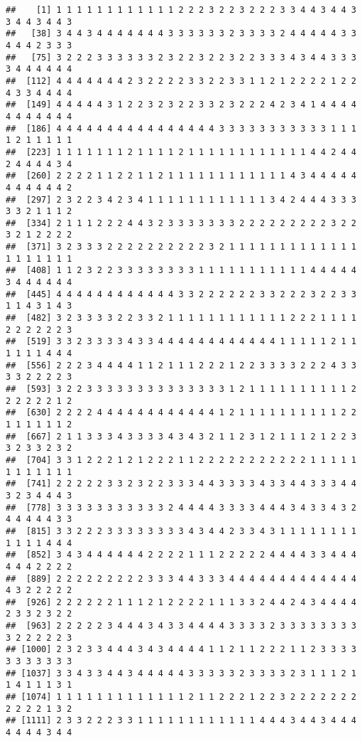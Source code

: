 \documentclass[
]{article}
\begin{document}
\begin{verbatim}
##    [1] 1 1 1 1 1 1 1 1 1 1 1 1 2 2 2 3 2 2 3 2 2 2 3 3 4 4 3 4 4 3 3 4 4 3 4 4 3
##   [38] 3 4 4 3 4 4 4 4 4 4 4 3 3 3 3 3 3 2 3 3 3 3 2 4 4 4 4 4 3 3 4 4 4 2 3 3 3
##   [75] 3 2 2 2 3 3 3 3 3 3 2 3 2 2 3 2 2 3 2 2 3 3 3 4 3 4 4 3 3 3 3 4 4 4 4 4 4
##  [112] 4 4 4 4 4 4 4 2 3 2 2 2 2 3 3 2 2 3 3 1 1 2 1 2 2 2 2 1 2 2 4 3 3 4 4 4 4
##  [149] 4 4 4 4 4 3 1 2 2 3 2 3 2 2 3 3 2 3 2 2 2 4 2 3 4 1 4 4 4 4 4 4 4 4 4 4 4
##  [186] 4 4 4 4 4 4 4 4 4 4 4 4 4 4 4 4 3 3 3 3 3 3 3 3 3 3 3 1 1 1 1 2 1 1 1 1 1
##  [223] 1 1 1 1 1 1 1 2 1 1 1 1 2 1 1 1 1 1 1 1 1 1 1 1 1 4 4 2 4 4 2 4 4 4 4 3 4
##  [260] 2 2 2 2 1 1 2 2 1 1 2 1 1 1 1 1 1 1 1 1 1 1 1 4 3 4 4 4 4 4 4 4 4 4 4 4 2
##  [297] 2 3 2 2 3 4 2 3 4 1 1 1 1 1 1 1 1 1 1 1 1 3 4 2 4 4 4 3 3 3 3 3 2 1 1 1 2
##  [334] 2 1 1 1 2 2 2 4 4 3 2 3 3 3 3 3 3 3 2 2 2 2 2 2 2 2 2 3 2 2 3 2 1 2 2 2 2
##  [371] 3 2 3 3 3 2 2 2 2 2 2 2 2 2 2 3 2 1 1 1 1 1 1 1 1 1 1 1 1 1 1 1 1 1 1 1 1
##  [408] 1 1 2 3 2 2 3 3 3 3 3 3 3 3 1 1 1 1 1 1 1 1 1 1 1 4 4 4 4 4 3 4 4 4 4 4 4
##  [445] 4 4 4 4 4 4 4 4 4 4 4 4 3 3 2 2 2 2 2 2 3 3 2 2 2 3 2 2 3 3 1 1 4 3 1 4 3
##  [482] 3 2 3 3 3 3 2 2 3 3 2 1 1 1 1 1 1 1 1 1 1 1 1 2 2 2 1 1 1 1 2 2 2 2 2 2 3
##  [519] 3 3 2 3 3 3 3 4 3 3 4 4 4 4 4 4 4 4 4 4 4 4 1 1 1 1 1 2 1 1 1 1 1 1 4 4 4
##  [556] 2 2 2 3 4 4 4 4 1 1 2 1 1 1 2 2 2 1 2 2 3 3 3 3 2 2 2 4 3 3 3 3 2 2 2 2 3
##  [593] 3 2 2 3 3 3 3 3 3 3 3 3 3 3 3 3 3 1 2 1 1 1 1 1 1 1 1 1 1 2 2 2 2 2 2 1 2
##  [630] 2 2 2 2 4 4 4 4 4 4 4 4 4 4 4 4 1 2 1 1 1 1 1 1 1 1 1 1 2 2 1 1 1 1 1 1 2
##  [667] 2 1 1 3 3 3 4 3 3 3 3 4 3 4 3 2 1 1 2 3 1 2 1 1 1 2 1 2 2 3 3 2 3 3 2 3 2
##  [704] 3 3 1 2 2 2 1 2 1 2 2 2 1 1 2 2 2 2 2 2 2 2 2 2 2 1 1 1 1 1 1 1 1 1 1 1 1
##  [741] 2 2 2 2 2 3 3 2 3 2 2 3 3 3 4 4 3 3 3 3 4 3 3 4 4 3 3 3 4 4 3 2 3 4 4 4 3
##  [778] 3 3 3 3 3 3 3 3 3 3 3 2 4 4 4 4 3 3 3 3 4 4 4 3 4 3 3 4 3 2 4 4 4 4 4 3 3
##  [815] 3 3 2 2 2 3 3 3 3 3 3 3 3 4 3 4 4 2 3 3 4 3 1 1 1 1 1 1 1 1 1 1 1 1 4 4 4
##  [852] 3 4 3 4 4 4 4 4 4 2 2 2 2 1 1 1 2 2 2 2 2 4 4 4 4 3 3 4 4 4 4 4 4 2 2 2 2
##  [889] 2 2 2 2 2 2 2 2 2 3 3 3 4 4 3 3 3 4 4 4 4 4 4 4 4 4 4 4 4 4 4 3 2 2 2 2 2
##  [926] 2 2 2 2 2 2 1 1 1 2 1 2 2 2 2 1 1 1 3 3 2 4 4 2 4 3 4 4 4 4 2 3 3 2 3 2 2
##  [963] 2 2 2 2 2 3 4 4 4 3 4 3 3 4 4 4 4 3 3 3 3 2 3 3 3 3 3 3 3 3 3 2 2 2 2 2 3
## [1000] 2 3 2 3 3 4 4 4 3 4 3 4 4 4 4 1 1 2 1 1 2 2 2 1 1 2 3 3 3 3 3 3 3 3 3 3 3
## [1037] 3 3 4 3 3 4 4 3 4 4 4 4 4 3 3 3 3 3 2 3 3 3 3 2 3 1 1 1 2 1 1 4 1 1 1 3 1
## [1074] 1 1 1 1 1 1 1 1 1 1 1 1 1 2 1 1 2 2 2 1 2 2 3 2 2 2 2 2 2 2 2 2 2 2 1 3 2
## [1111] 2 3 3 2 2 2 3 3 1 1 1 1 1 1 1 1 1 1 1 1 4 4 4 3 4 4 3 4 4 4 4 4 4 4 3 4 4

\end{verbatim}
\end{document}
